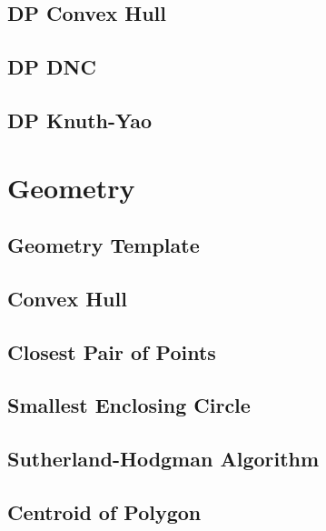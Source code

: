 \subsection{DP Convex Hull}

\subsection{DP DNC}

\subsection{DP Knuth-Yao}

\section{Geometry}
\subsection{Geometry Template}

\subsection{Convex Hull}

\subsection{Closest Pair of Points}

\subsection{Smallest Enclosing Circle}

\subsection{Sutherland-Hodgman Algorithm}

\subsection{Centroid of Polygon}

